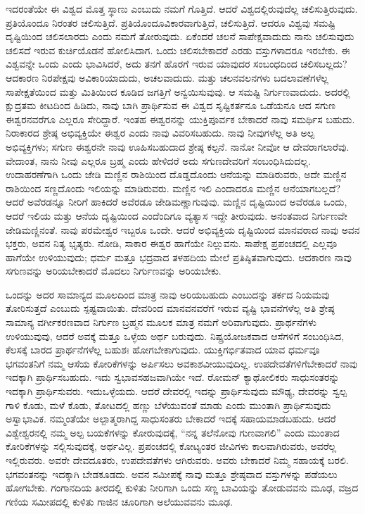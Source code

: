 ಇದರಂತೆಯೇ ಈ ವಿಶ್ವದ ಮೊತ್ತ ಸ್ಥಾಣು ಎಂಬುದು ನಮಗೆ ಗೊತ್ತಿದೆ. ಆದರೆ ವಿಶ್ವದಲ್ಲಿರುವುದೆಲ್ಲ ಚಲಿಸುತ್ತಿರುವುದು. ಪ್ರತಿಯೊಂದೂ ನಿರಂತರ ಚಲಿಸುತ್ತಿದೆ. ಪ್ರತಿಯೊಂದೂ\break ವಿಕಾರವಾಗುತ್ತಿದೆ, ಚಲಿಸುತ್ತಿದೆ. ಆದರೂ ವಿಶ್ವವು ಸಮಷ್ಟಿ ದೃಷ್ಟಿಯಿಂದ ಚಲಿಸಲಾರದು ಎಂದು ನಮಗೆ ತೋರುವುದು. ಏಕೆಂದರೆ ಚಲನೆ ಸಾಪೇಕ್ಷವಾದುದು  ನಾನು ಚಲಿಸುವುದು ಚಲಿಸದೆ ಇರುವ ಕುರ್ಚಿಯೊಡನೆ ಹೋಲಿಸಿದಾಗ. ಒಂದು ಚಲಿಸಬೇಕಾದರೆ ಎರಡು ವಸ್ತುಗಳಾದರೂ ಇರಬೇಕು. ಈ ವಿಶ್ವವನ್ನೇ ಒಂದು ಎಂದು ಭಾವಿಸಿದರೆ, ಅದು ತನಗೆ ಹೊರಗೆ ಇರುವ ಯಾವುದರ ಸಂಬಂಧದಿಂದ ಚಲಿಸಬಲ್ಲದು? ಆದಕಾರಣ ನಿರಪೇಕ್ಷವು ಅವಿಕಾರಿಯಾದುದು, ಅಚಲವಾದುದು. ಮತ್ತು ಚಲನವಲನಗಳು ಬದಲಾವಣೆಗಳೆಲ್ಲ ಸಾಪೇಕ್ಷತೆಯಿಂದ ಮತ್ತು ಮಿತಿಯಿಂದ ಕೂಡಿದ ಜಗತ್ತಿಗೆ ಅನ್ವಯಿಸುವುವು. ಆ ಸಮಷ್ಟಿ ನಿರ್ಗುಣವಾದುದು. ಅದರಲ್ಲಿ ಕ್ಷುದ್ರತಮ ಕೀಟದಿಂದ ಹಿಡಿದು, ನಾವು ಬಾಗಿ ಪ್ರಾರ್ಥಿಸುವ ಈ ವಿಶ್ವದ ಸೃಷ್ಟಿಕರ್ತನೂ ಒಡೆಯನೂ ಆದ ಸಗುಣ ಈಶ್ವರನವರೆಗೂ ಎಲ್ಲರೂ ಸೇರಿದ್ದಾರೆ. ಇಂತಹ ಈಶ್ವರನನ್ನು ಯುಕ್ತಿಪೂರ್ವಕ ಬೇಕಾದರೆ ನಾವು ಸಮರ್ಥಿಸ ಬಹುದು. ನಿರಾಕಾರದ ಶ್ರೇಷ್ಠ ಅಭಿವ್ಯಕ್ತಿಯೇ ಈಶ್ವರ ಎಂದು ನಾವು ವಿವರಿಸಬಹುದು. ನಾವು ನೀವುಗಳೆಲ್ಲ ಅತಿ ಅಲ್ಪ ಅಭಿವ್ಯಕ್ತಿಗಳು; ಸಗುಣ ಈಶ್ವರನೇ ನಾವು ಊಹಿಸಬಹುದಾದ ಶ್ರೇಷ್ಠ ಕಲ್ಪನೆ. ನಾನೋ ನೀವೋ ಆ ದೇವರಾಗಲಾರೆವು. ವೇದಾಂತ, ನಾನು ನೀವು ಎಲ್ಲರೂ ಬ್ರಹ್ಮ ಎಂದು ಹೇಳಿದರೆ ಅದು ಸಗುಣದೇವರಿಗೆ ಸಂಬಂಧಿಸಿದುದಲ್ಲ. ಉದಾಹರಣೆಗಾಗಿ ಒಂದು ಜೇಡಿ ಮಣ್ಣಿನ ರಾಶಿಯಿಂದ ದೊಡ್ಡದೊಂದು ಆನೆಯನ್ನು ಮಾಡಿರುವರು, ಅದೇ ಮಣ್ಣಿನ ರಾಶಿಯಿಂದ ಸಣ್ಣದೊಂದು ಇಲಿಯನ್ನು ಮಾಡಿರುವರು. ಮಣ್ಣಿನ ಇಲಿ ಎಂದಾದರೂ ಮಣ್ಣಿನ ಆನೆಯಾಗಬಲ್ಲದೆ? ಆದರೆ ಅವೆರಡನ್ನೂ ನೀರಿಗೆ ಹಾಕಿದರೆ ಅವೆರಡೂ ಜೇಡಿಮಣ್ಣಾಗುವುವು. ಮಣ್ಣಿನ ದೃಷ್ಟಿಯಿಂದ ಅವೆರಡೂ ಒಂದು, ಆದರೆ ಇಲಿಯ ಮತ್ತು ಆನೆಯ ದೃಷ್ಟಿಯಿಂದ ಎಂದೆಂದಿಗೂ ವ್ಯತ್ಯಾಸ ಇದ್ದೇ ತೀರುವುದು. ಅನಂತವಾದ ನಿರ್ಗುಣವೇ ಜೇಡಿಮಣ್ಣಿನಂತೆ. ನಾವು ಪರಮೇಶ್ವರ ಇಬ್ಬರೂ ಒಂದೇ. ಆದರೆ ಅಭಿವ್ಯಕ್ತಿಯ ದೃಷ್ಟಿಯಿಂದ ಮಾನವರಾದ ನಾವು ಅವನ ಭಕ್ತರು, ಅವನ ನಿತ್ಯ ಭೃತ್ಯರು. ನೋಡಿ, ಸಾಕಾರ ಈಶ್ವರ ಹಾಗೆಯೇ ನಿಲ್ಲುವನು. ಸಾಪೇಕ್ಷ ಪ್ರಪಂಚದಲ್ಲಿ ಎಲ್ಲವೂ ಹಾಗೆಯೇ ಉಳಿಯುವುದು; ಧರ್ಮ ಮತ್ತೂ ಭದ್ರವಾದ ತಳಹದಿಯ ಮೇಲೆ ಪ್ರತಿಷ್ಠಿತವಾಗುವುದು. ಆದಕಾರಣ ನಾವು ಸಗುಣವನ್ನು ಅರಿಯಬೇಕಾದರೆ ಮೊದಲು ನಿರ್ಗುಣವನ್ನು ಅರಿಯಬೇಕು.

ಒಂದನ್ನು  ಅದರ ಸಾಮಾನ್ಯದ  ಮೂಲದಿಂದ ಮಾತ್ರ ನಾವು ಅರಿಯಬಹುದು ಎಂಬುದನ್ನು ತರ್ಕದ ನಿಯಮವು ತೋರಿಸುತ್ತದೆ ಎಂಬುದು ಸ್ಪಷ್ಟವಾಯಿತು. ದೇವರಿಂದ ಮಾನವನವರೆಗೆ ಇರುವ ವ್ಯಷ್ಟಿ ಭಾವನೆಗಳೆಲ್ಲ ಅತಿ ಶ್ರೇಷ್ಠ ಸಾಮಾನ್ಯ ವರ್ಗೀಕರಣವಾದ ನಿರ್ಗುಣ ಬ್ರಹ್ಮನ ಮೂಲಕ ಮಾತ್ರ ನಮಗೆ ಅರಿವಾಗುವುದು. ಪ್ರಾರ್ಥನೆಗಳು ಉಳಿಯುವುವು, ಆದರೆ ಅವಕ್ಕೆ ಮತ್ತೂ ಒಳ್ಳೆಯ ಅರ್ಥ ಬರುವುದು. ನಿಷ್ಪ್ರಯೋಜಕವಾದ ಆಸೆಗಳಿಗೆ ಸಂಬಂಧಿಸಿದ, ಕೆಲಸಕ್ಕೆ ಬಾರದ ಪ್ರಾರ್ಥನೆಗಳೆಲ್ಲ ಬಹುಶಃ ಹೋಗಬೇಕಾಗುವುದು. ಯುಕ್ತಿಗರ್ಭಿತವಾದ ಯಾವ ಧರ್ಮವೂ ಭಗವಂತನಿಗೆ ನಮ್ಮ ಆಸೆಯ ಕೋರಿಕೆಗಳನ್ನು ಅರ್ಪಿಸಲು ಅವಕಾಶವೀಯುವುದಿಲ್ಲ. ಉಪದೇವತೆಗಳಿಗೆ\break ಬೇಕಾದರೆ ನಾವು ಇದಕ್ಕಾಗಿ ಪ್ರಾರ್ಥಿಸಬಹುದು. ಇದು ಸ್ವಭಾವಸಹಜವಾಗಿಯೇ ಇದೆ. ರೋಮನ್ ಕ್ಯಾಥೋಲಿಕರು ಸಾಧುಸಂತರನ್ನು ಇದಕ್ಕಾಗಿ ಪ್ರಾರ್ಥಿಸುವರು. ಇದು\break ಒಳ್ಳೆಯದು. ಆದರೆ ದೇವರಲ್ಲಿ ಇದನ್ನು ಪ್ರಾರ್ಥಿಸುವುದು ಮೌಢ್ಯ, ದೇವರನ್ನು ಸ್ವಲ್ಪ ಗಾಳಿ ಕೊಡು, ಮಳೆ ಕೊಡು, ತೋಟದಲ್ಲಿ ಹಣ್ಣು ಬೆಳೆಯುವಂತೆ ಮಾಡು ಎಂದು ಮುಂತಾಗಿ ಪ್ರಾರ್ಥಿಸುವುದು ಅಸ್ವಾಭಾವಿಕ. ನಮ್ಮಂತೆಯೇ ಅಲ್ಪಾತ್ಮರಾಗಿದ್ದ ಸಾಧುಸಂತರು ಬೇಕಾದರೆ ಇದಕ್ಕೆ ಸಹಾಯಮಾಡಬಹುದು. ಆದರೆ ವಿಶ್ವೇಶ್ವರನಲ್ಲಿ ನಮ್ಮ ಅಲ್ಪ ಬಯಕೆಗಳನ್ನು ಕೋರುವುದಕ್ಕೆ, “ನನ್ನ ತಲೆನೋವು ಗುಣವಾಗಲಿ'' ಎಂದು ಮುಂತಾದ ಕೋರಿಕೆಗಳನ್ನು ಸಲ್ಲಿಸುವುದಕ್ಕೆ, ಅರ್ಥವಿಲ್ಲ. ಪ್ರಪಂಚದಲ್ಲಿ ಕೋಟ್ಯಂತರ ಜೀವಿಗಳು ಕಾಲವಾಗಿರುವರು, ಅವರೆಲ್ಲ ಇಲ್ಲಿರುವರು. ಅವರೇ ದೇವದೂತರು, ಉಪದೇವತೆಗಳು ಆಗಿರುವರು. ಅವರು ಬೇಕಾದರೆ ನಿಮ್ಮ ಸಹಾಯಕ್ಕೆ ಬರಲಿ. ಭಗವಂತನನ್ನು ಇದಕ್ಕಾಗಿ ಬೇಡಕೂಡದು. ಅವನ ಸಮೀಪಕ್ಕೆ ನಾವು ಮತ್ತೂ ಶ್ರೇಷ್ಠವಾದ ವಸ್ತುಗಳನ್ನು ಪಡೆಯಲು ಹೋಗಬೇಕು. ಗಂಗಾನದಿಯ ತೀರದಲ್ಲಿ ಕುಳಿತು ನೀರಿಗಾಗಿ ಒಂದು ಸಣ್ಣ ಬಾವಿಯನ್ನು ತೋಡುವವನು ಮೂಢ, ವಜ್ರದ ಗಣಿಯ ಸಮೀಪದಲ್ಲಿ ಕುಳಿತು ಗಾಜಿನ ಚೂರಿಗಾಗಿ ಅಲೆಯುವವನು ಮೂಢ.


